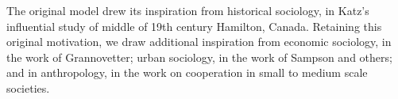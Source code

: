 \documentclass{article}
\begin{document}
The original model drew its inspiration from historical sociology, in Katz's influential study of middle of 19th century Hamilton, Canada. Retaining this original motivation, we draw additional inspiration from economic sociology, in the work of Grannovetter; urban sociology, in the work of Sampson and others; and in anthropology, in the work on cooperation in small to medium scale societies.  
 






\cite{power2018cooperation,power2018}

\cite{koster2019,koster2014,koster2015,bogerhoff2015}
\end{document}
